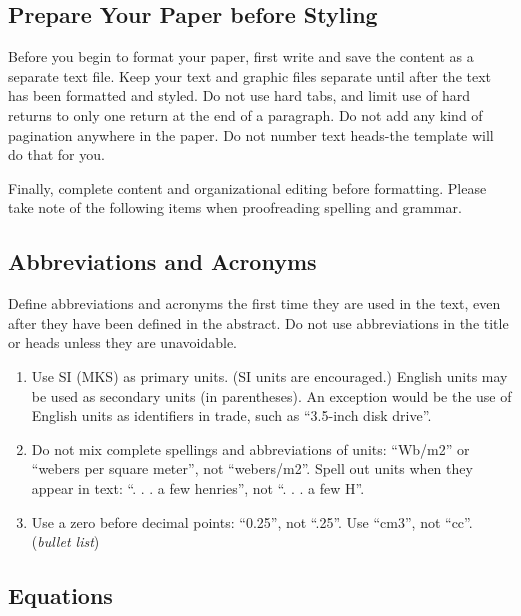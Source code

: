 \documentclass{article} %
\begin{document}
\begin{multicols}{2}
\section{Prepare Your Paper before Styling}

Before you begin to format your paper, first write and save the content as a separate text file. Keep your text and graphic files separate until after the text has been formatted and styled. Do not use hard tabs, and limit use of hard returns to only one return at the end of a paragraph. Do not add any kind of pagination anywhere in the paper. Do not number text heads-the template will do that for you.

Finally, complete content and organizational editing before formatting. Please take note of the following items when proofreading spelling and grammar.


\subsection{Abbreviations and Acronyms}

Define abbreviations and acronyms the first time they are used in the text, even after they have been defined in the abstract. Do not use abbreviations in the title or heads unless they are unavoidable.



\begin{enumerate}
\item \textit{ }Use SI (MKS) as primary units. (SI units are encouraged.) English units may be used as secondary units (in parentheses). An exception would be the use of English units as identifiers in trade, such as ``3.5-inch disk drive''.

\item  Do not mix complete spellings and abbreviations of units: ``Wb/m2'' or ``webers per square meter'', not ``webers/m2''.  Spell out units when they appear in text: ``. . . a few henries'', not ``. . . a few H''.

\item  Use a zero before decimal points: ``0.25'', not ``.25''. Use ``cm3'', not ``cc''. (\textit{bullet list})
\end{enumerate}


\subsection{Equations}


\end{multicols}
\end{document}

